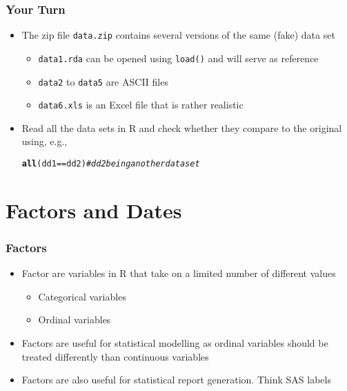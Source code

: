 \documentclass[paper=screen,mathserif]{beamer}\usepackage[]{graphicx}\usepackage[]{color}
\makeatletter
\newcommand{\hlcom}[1]{\textcolor[rgb]{0.678,0.584,0.686}{\textit{#1}}}%
\newcommand{\hlopt}[1]{\textcolor[rgb]{0,0,0}{#1}}%
\newcommand{\hlstd}[1]{\textcolor[rgb]{0.345,0.345,0.345}{#1}}%
\newcommand{\hlkwd}[1]{\textcolor[rgb]{0.737,0.353,0.396}{\textbf{#1}}}%
\newenvironment{kframe}{%
 \def\at@end@of@kframe{}%
 \ifinner\ifhmode%
  \def\at@end@of@kframe{\end{minipage}}%
  \begin{minipage}{\columnwidth}%
 \fi\fi%
 \def\FrameCommand##1{\hskip\@totalleftmargin \hskip-\fboxsep
 \colorbox{shadecolor}{##1}\hskip-\fboxsep
     \hskip-\linewidth \hskip-\@totalleftmargin \hskip\columnwidth}%
 \MakeFramed {\advance\hsize-\width
   \@totalleftmargin\z@ \linewidth\hsize
   \@setminipage}}%
 {\par\unskip\endMakeFramed%
 \at@end@of@kframe}
\newenvironment{knitrout}{}{} %
\newcommand{\ft}[1]{\frametitle{#1}}
\makeatother
\begin{document}
\begin{frame}[fragile]
  \ft{Your Turn}
  \begin{itemize}
  \item The zip file {\tt data.zip} contains several versions of the
    same (fake) data set
    \begin{itemize}
    \item {\tt data1.rda} can be opened using \verb=load()= and will
      serve as reference
    \item {\tt data2} to {\tt data5} are ASCII files
    \item {\tt data6.xls} is an Excel file that is rather realistic
    \end{itemize}
  \item Read all the data sets in R and check whether they compare to
    the original using, e.g., 
\begin{knitrout}\scriptsize
{}\color{fgcolor}\begin{kframe}
\begin{alltt}
\hlkwd{all}\hlstd{(dd1} \hlopt{==} \hlstd{dd2)} \hlcom{# dd2 being another data set}
\end{alltt}
\end{kframe}
\end{knitrout}
 
  \end{itemize}
  
\end{frame}



\section{Factors and Dates}

\begin{frame}[fragile]
  \ft{Factors}
  \begin{itemize}
  \item Factor are variables in R that take on a limited number of
    different values
    \begin{itemize}
    \item Categorical variables
    \item Ordinal variables
    \end{itemize}
  \item Factors are useful for statistical modelling as ordinal
    variables should be treated differently than continuous variables
  \item Factors are also useful for statistical report
    generation. Think SAS labels
  \end{itemize}
\end{frame}
\end{document}
